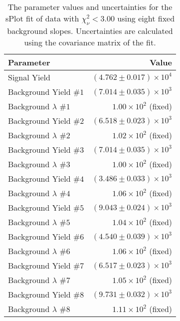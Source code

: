 
\begin{table}[ht]
    \begin{center}
        \begin{tabular}{lr}\toprule
            Parameter & Value \\\midrule
            Signal Yield & $(4.762 \pm 0.017) \times 10^{4}$ \\
            Background Yield $\#1$ & $(7.014 \pm 0.035) \times 10^{3}$ \\
            Background $\lambda$ $\#1$ & $1.00 \times 10^{2}$ (fixed) \\
            Background Yield $\#2$ & $(6.518 \pm 0.023) \times 10^{3}$ \\
            Background $\lambda$ $\#2$ & $1.02 \times 10^{2}$ (fixed) \\
            Background Yield $\#3$ & $(7.014 \pm 0.035) \times 10^{3}$ \\
            Background $\lambda$ $\#3$ & $1.00 \times 10^{2}$ (fixed) \\
            Background Yield $\#4$ & $(3.486 \pm 0.033) \times 10^{3}$ \\
            Background $\lambda$ $\#4$ & $1.06 \times 10^{2}$ (fixed) \\
            Background Yield $\#5$ & $(9.043 \pm 0.024) \times 10^{3}$ \\
            Background $\lambda$ $\#5$ & $1.04 \times 10^{2}$ (fixed) \\
            Background Yield $\#6$ & $(4.540 \pm 0.039) \times 10^{3}$ \\
            Background $\lambda$ $\#6$ & $1.06 \times 10^{2}$ (fixed) \\
            Background Yield $\#7$ & $(6.517 \pm 0.023) \times 10^{3}$ \\
            Background $\lambda$ $\#7$ & $1.05 \times 10^{2}$ (fixed) \\
            Background Yield $\#8$ & $(9.731 \pm 0.032) \times 10^{3}$ \\
            Background $\lambda$ $\#8$ & $1.11 \times 10^{2}$ (fixed) \\\bottomrule
        \end{tabular}
        \caption{The parameter values and uncertainties for the sPlot fit of data with $\chi^2_\nu < 3.00$ using eight fixed background slopes. Uncertainties are calculated using the covariance matrix of the fit.}\label{tab:splot-fit-results-chisqdof-3.00-fixed-8}
    \end{center}
\end{table}
